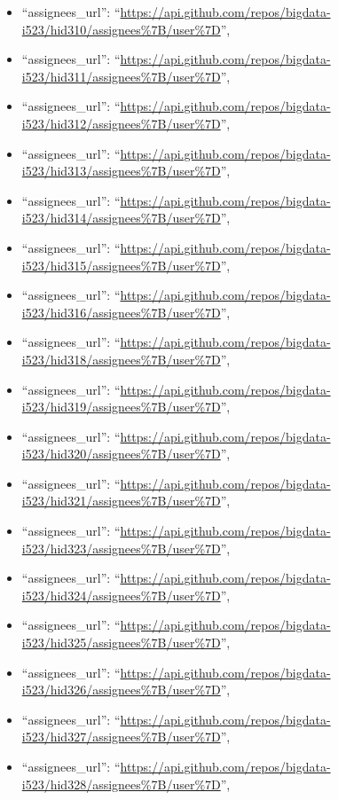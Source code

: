\begin{itemize}
\item
  ``assignees\_url'':
  ``\url{https://api.github.com/repos/bigdata-i523/hid310/assignees\%7B/user\%7D}'',
\item
  ``assignees\_url'':
  ``\url{https://api.github.com/repos/bigdata-i523/hid311/assignees\%7B/user\%7D}'',
\item
  ``assignees\_url'':
  ``\url{https://api.github.com/repos/bigdata-i523/hid312/assignees\%7B/user\%7D}'',
\item
  ``assignees\_url'':
  ``\url{https://api.github.com/repos/bigdata-i523/hid313/assignees\%7B/user\%7D}'',
\item
  ``assignees\_url'':
  ``\url{https://api.github.com/repos/bigdata-i523/hid314/assignees\%7B/user\%7D}'',
\item
  ``assignees\_url'':
  ``\url{https://api.github.com/repos/bigdata-i523/hid315/assignees\%7B/user\%7D}'',
\item
  ``assignees\_url'':
  ``\url{https://api.github.com/repos/bigdata-i523/hid316/assignees\%7B/user\%7D}'',
\item
  ``assignees\_url'':
  ``\url{https://api.github.com/repos/bigdata-i523/hid318/assignees\%7B/user\%7D}'',
\item
  ``assignees\_url'':
  ``\url{https://api.github.com/repos/bigdata-i523/hid319/assignees\%7B/user\%7D}'',
\item
  ``assignees\_url'':
  ``\url{https://api.github.com/repos/bigdata-i523/hid320/assignees\%7B/user\%7D}'',
\item
  ``assignees\_url'':
  ``\url{https://api.github.com/repos/bigdata-i523/hid321/assignees\%7B/user\%7D}'',
\item
  ``assignees\_url'':
  ``\url{https://api.github.com/repos/bigdata-i523/hid323/assignees\%7B/user\%7D}'',
\item
  ``assignees\_url'':
  ``\url{https://api.github.com/repos/bigdata-i523/hid324/assignees\%7B/user\%7D}'',
\item
  ``assignees\_url'':
  ``\url{https://api.github.com/repos/bigdata-i523/hid325/assignees\%7B/user\%7D}'',
\item
  ``assignees\_url'':
  ``\url{https://api.github.com/repos/bigdata-i523/hid326/assignees\%7B/user\%7D}'',
\item
  ``assignees\_url'':
  ``\url{https://api.github.com/repos/bigdata-i523/hid327/assignees\%7B/user\%7D}'',
\item
  ``assignees\_url'':
  ``\url{https://api.github.com/repos/bigdata-i523/hid328/assignees\%7B/user\%7D}'',

\end{itemize}
